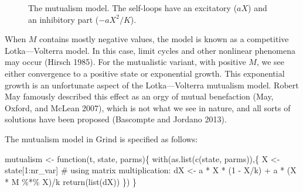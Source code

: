 \documentclass[
  a4paper,
  DIV=11,
  numbers=noendperiod,
  oneside]{scrreprt}
\newenvironment{Shaded}{}{}
\newcommand{\CommentTok}[1]{\textcolor[rgb]{0.42,0.45,0.49}{#1}}
\newcommand{\ControlFlowTok}[1]{\textcolor[rgb]{0.84,0.23,0.29}{#1}}
\newcommand{\DecValTok}[1]{\textcolor[rgb]{0.00,0.36,0.77}{#1}}
\newcommand{\FunctionTok}[1]{\textcolor[rgb]{0.44,0.26,0.76}{#1}}
\newcommand{\NormalTok}[1]{\textcolor[rgb]{0.14,0.16,0.18}{#1}}
\newcommand{\OtherTok}[1]{\textcolor[rgb]{0.44,0.26,0.76}{#1}}
\newcommand{\SpecialCharTok}[1]{\textcolor[rgb]{0.00,0.36,0.77}{#1}}
\begin{document}
\begin{figure}


\caption{\label{fig-ch6-img6-old-75}The mutualism model. The self-loops
have an excitatory (\(aX\)) and an inhibitory part (\(- aX^{2}/K\)).}

\end{figure}%

When \(M\) contains mostly negative values, the model is known as a
competitive Lotka---Volterra model. In this case, limit cycles and other
nonlinear phenomena may occur (Hirsch 1985). For the mutualistic
variant, with positive \(M\), we see either convergence to a positive
state or exponential growth. This exponential growth is an unfortunate
aspect of the Lotka---Volterra mutualism model. Robert May famously
described this effect as an orgy of mutual benefaction (May, Oxford, and
McLean 2007), which is not what we see in nature, and all sorts of
solutions have been proposed (Bascompte and Jordano 2013).

The mutualism model in Grind is specified as follows:

\begin{Shaded}
\begin{Highlighting}[]
\NormalTok{mutualism }\OtherTok{\textless{}{-}} \ControlFlowTok{function}\NormalTok{(t, state, parms)\{}
  \FunctionTok{with}\NormalTok{(}\FunctionTok{as.list}\NormalTok{(}\FunctionTok{c}\NormalTok{(state, parms)),\{}
\NormalTok{    X }\OtherTok{\textless{}{-}}\NormalTok{ state[}\DecValTok{1}\SpecialCharTok{:}\NormalTok{nr\_var]}
    \CommentTok{\# using matrix multiplication:}
\NormalTok{    dX }\OtherTok{\textless{}{-}}\NormalTok{ a }\SpecialCharTok{*}\NormalTok{ X }\SpecialCharTok{*}\NormalTok{ (}\DecValTok{1} \SpecialCharTok{{-}}\NormalTok{ X}\SpecialCharTok{/}\NormalTok{k) }\SpecialCharTok{+}\NormalTok{ a }\SpecialCharTok{*}\NormalTok{ (X }\SpecialCharTok{*}\NormalTok{ M }\SpecialCharTok{\%*\%}\NormalTok{ X)}\SpecialCharTok{/}\NormalTok{k }
    \FunctionTok{return}\NormalTok{(}\FunctionTok{list}\NormalTok{(dX))}
\NormalTok{  \})}
\NormalTok{\}}
\end{Highlighting}
\end{Shaded}
\end{document}
